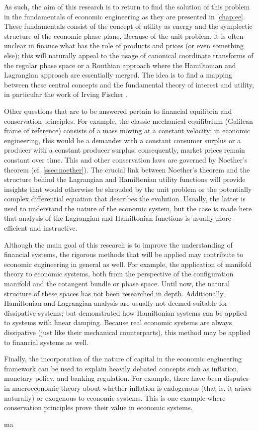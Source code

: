 As such, the aim of this research is to return to find the solution of this problem in the fundamentals of economic engineering as they are presented in \cref{chap:ee}. These fundamentals consist of the concept of utility as energy and the symplectic structure of the economic phase plane. Because of the unit problem, it is often unclear in finance what has the role of products and prices (or even something else); this will naturally appeal to the usage of canonical coordinate transforms of the regular phase space or a Routhian approach where the Hamiltonian and Lagrangian approach are essentially merged. The idea is to find a mapping between these central concepts and the fundamental theory of interest and utility, in particular the work of Irving Fischer \cite{Fisher1906,Fisher1930}.

Other questions that are to be answered pertain to financial equilibria and conservation principles. For example, the classic mechanical equilibrium (Galilean frame of reference) consists of a mass moving at a constant velocity; in economic engineering, this would be a demander with a constant consumer surplus or a producer with a constant producer surplus; consequently, market prices remain constant over time. This and other conservation laws are governed by Noether's theorem (cf. \cref{ssec:noether}). The crucial link between Noether's theorem and the structure behind the Lagrangian and Hamiltonian utility functions will provide insights that would otherwise be shrouded by the unit problem or the potentially complex differential equation that describes the evolution. Usually, the latter is used to understand the nature of the economic system, but the case is made here that analysis of the Lagrangian and Hamiltonian functions is usually more efficient and instructive.

Although the main goal of this research is to improve the understanding of financial systems, the rigorous methods that will be applied may contribute to economic engineering in general as well. For example, the application of manifold theory to economic systems, both from the perspective of the configuration manifold and the cotangent bundle or phase space. Until now, the natural structure of these spaces has not been researched in depth. Additionally, Hamiltonian and Lagrangian analysis are usually not deemed suitable for dissipative systems; but \citet{Hutters2020} demonstrated how Hamiltonian systems can be applied to systems with linear damping. Because real economic systems are always dissipative (just like their mechanical counterparts), this method may be applied to financial systems as well.

Finally, the incorporation of the nature of capital in the economic engineering framework can be used to explain heavily debated concepts such as inflation, monetary policy, and banking regulation. For example, there have been disputes in  macroeconomic theory about whether inflation is endogenous (that is, it arises naturally) or exogenous to economic systems. This is one example where conservation principles prove their value in economic systems.

ma